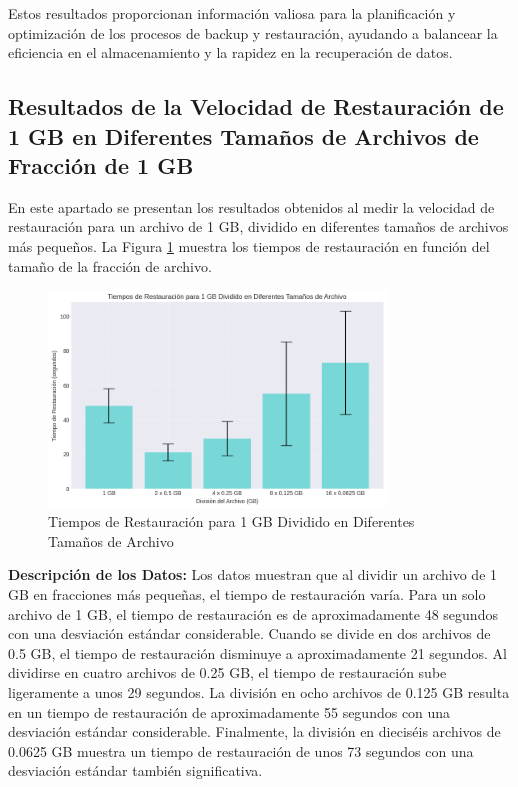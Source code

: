 Estos resultados proporcionan información valiosa para la planificación y optimización de los procesos de backup y restauración, ayudando a balancear la eficiencia en el almacenamiento y la rapidez en la recuperación de datos.

\subsection{Resultados de la Velocidad de Restauración de 1 GB en Diferentes Tamaños de Archivos de Fracción de 1 GB}

En este apartado se presentan los resultados obtenidos al medir la velocidad de restauración para un archivo de 1 GB, dividido en diferentes tamaños de archivos más pequeños. La Figura \ref{fig:tiempo-restauracion-fraccion} muestra los tiempos de restauración en función del tamaño de la fracción de archivo.

\begin{figure}[H]
    \centering
    \includegraphics[width=0.8\textwidth]{tiempo_de_restauracion.png}
    \caption{Tiempos de Restauración para 1 GB Dividido en Diferentes Tamaños de Archivo}
    \label{fig:tiempo-restauracion-fraccion}
\end{figure}

\textbf{Descripción de los Datos:}
Los datos muestran que al dividir un archivo de 1 GB en fracciones más pequeñas, el tiempo de restauración varía. Para un solo archivo de 1 GB, el tiempo de restauración es de aproximadamente 48 segundos con una desviación estándar considerable. Cuando se divide en dos archivos de 0.5 GB, el tiempo de restauración disminuye a aproximadamente 21 segundos. Al dividirse en cuatro archivos de 0.25 GB, el tiempo de restauración sube ligeramente a unos 29 segundos. La división en ocho archivos de 0.125 GB resulta en un tiempo de restauración de aproximadamente 55 segundos con una desviación estándar considerable. Finalmente, la división en dieciséis archivos de 0.0625 GB muestra un tiempo de restauración de unos 73 segundos con una desviación estándar también significativa.


